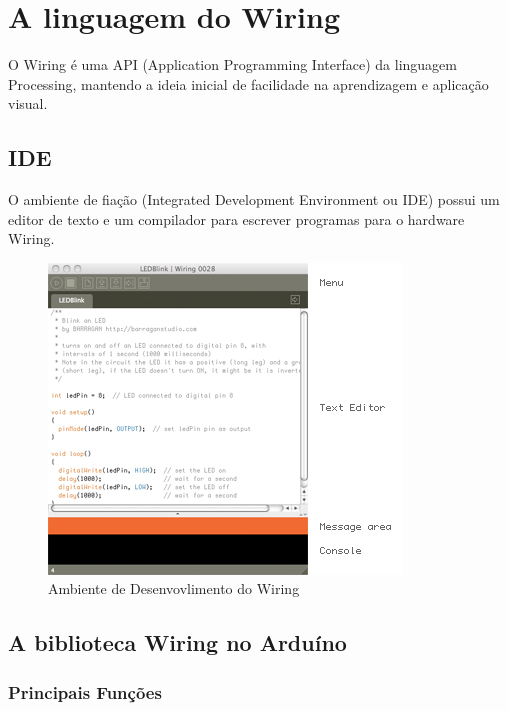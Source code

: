 \section{A linguagem do Wiring}

O Wiring é uma API (Application Programming Interface) da linguagem Processing, mantendo a ideia inicial de facilidade na aprendizagem e aplicação visual. 
\subsection{IDE }

O ambiente de fiação (Integrated Development Environment ou IDE) possui um editor de texto e um compilador para escrever programas para o hardware Wiring. 

\begin{figure}[htb]
	\caption{\label{wiringIDE}Ambiente de Desenvovlimento do Wiring}
	\begin{center}
	    \includegraphics[scale=0.9]{artigo/refs/ide.jpeg}
	\end{center}
\end{figure}

\subsection{A biblioteca Wiring no Arduíno}
\subsubsection{Principais Funções}

